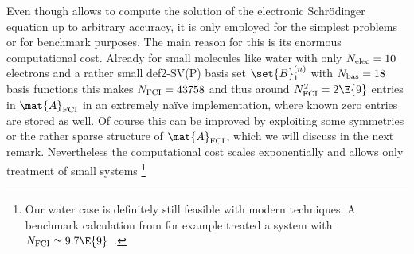 Even though \FCI allows to compute the solution of the electronic
Schrödinger equation up to arbitrary accuracy,
it is only employed for the simplest problems or for benchmark purposes.
The main reason for this is its enormous computational cost.
Already for small molecules like water with only
$N_\text{elec} = 10$ electrons and a rather small def2-SV(P)\cite{Schaefer1992} basis set
$\set{B}_1^{(n)}$ with $N_\text{bas} = 18$ basis functions this makes $N_\text{FCI} = 43758$
and thus around $\Nfci^2 = 2\E{9}$ entries in $\mat{A}_\text{FCI}$
in an extremely na\"{i}ve implementation,
where known zero entries are stored as well.
Of course this can be improved by exploiting some symmetries
or the rather sparse structure of $\mat{A}_\text{FCI}$,
which we will discuss in the next remark.
Nevertheless the computational cost scales exponentially
and allows only treatment of small systems%
\footnote{Our water case is definitely still feasible with modern
	\FCI techniques. A benchmark calculation from \citeyear{Rossi1999}
	for example treated a system with $\Nfci \simeq 9.7\E{9}$~\cite{Rossi1999}.
}

